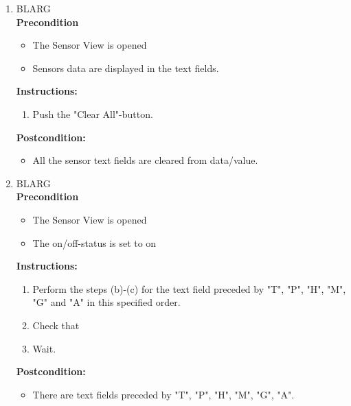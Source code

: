 \documentclass[a4paper]{article}
\newlength{\testlabellength}
\newenvironment{testlist}{\begin{enumerate}[label=\bfseries Instruction \thesubsection.\arabic* , labelindent=0pt, labelwidth=\testlabellength , leftmargin=2cm]}{\end{enumerate}}
\newenvironment{precondition}{
{\color{white}BLARG}\\ 
\textbf{Precondition}
\begin{itemize}[labelindent=0cm, labelwidth=2cm , leftmargin=1cm]
}
{\end{itemize}}
\newenvironment{instruction}{
\textbf{Instructions:}
\begin{enumerate}[label=\bfseries  \arabic*., labelindent=0cm, labelwidth=2cm , leftmargin=1cm]
}
{\end{enumerate}}
\newenvironment{postcondition}{
\textbf{Postcondition:}
\begin{itemize}[labelindent=0cm, labelwidth=2cm , leftmargin=1cm]
}
{\end{itemize}}
\begin{document}
\begin{appendices}
\begin{testlist}
	\item
		\begin{precondition}
			\item The Sensor View is opened
			\item Sensors data are displayed in the text fields.
		\end{precondition}
		\begin{instruction}
			\item Push the "Clear All"-button.
		\end{instruction}
		\begin{postcondition}
			\item All the sensor text fields are cleared from data/value.
		\end{postcondition}

	\item
		\begin{precondition}
			\item The Sensor View is opened
			\item The on/off-status is set to on
		\end{precondition}
		\begin{instruction}
			\item Perform the steps (b)-(c) for the text field preceded by "T", "P", "H", "M", "G" and "A" in this specified order.
    		\item Check that 
	    	\item Wait.
    	\end{instruction}
    	\begin{postcondition}
    		\item There are text fields preceded by "T", "P", "H", "M", "G", "A".
    	\end{postcondition}

		   

\end{testlist}
\end{appendices}
\end{document}
